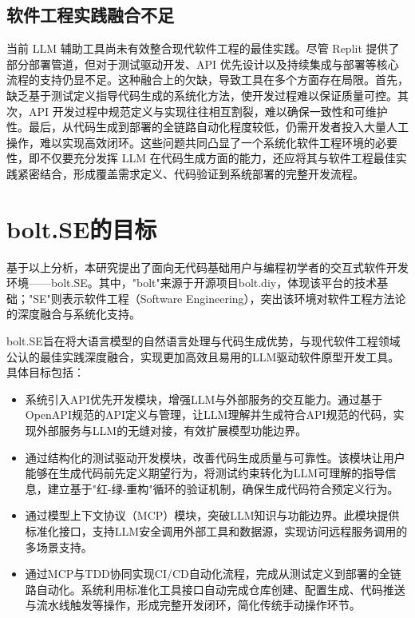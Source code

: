 \subsection{软件工程实践融合不足}

当前 LLM 辅助工具尚未有效整合现代软件工程的最佳实践。尽管 Replit 提供了部分部署管道，但对于测试驱动开发、API 优先设计以及持续集成与部署等核心流程的支持仍显不足。这种融合上的欠缺，导致工具在多个方面存在局限。首先，缺乏基于测试定义指导代码生成的系统化方法，使开发过程难以保证质量可控。其次，API 开发过程中规范定义与实现往往相互割裂，难以确保一致性和可维护性。最后，从代码生成到部署的全链路自动化程度较低，仍需开发者投入大量人工操作，难以实现高效闭环。这些问题共同凸显了一个系统化软件工程环境的必要性，即不仅要充分发挥 LLM 在代码生成方面的能力，还应将其与软件工程最佳实践紧密结合，形成覆盖需求定义、代码验证到系统部署的完整开发流程。

\section{bolt.SE的目标}

基于以上分析，本研究提出了面向无代码基础用户与编程初学者的交互式软件开发环境——bolt.SE。其中，"bolt"来源于开源项目bolt.diy，体现该平台的技术基础；"SE"则表示软件工程（Software Engineering），突出该环境对软件工程方法论的深度融合与系统化支持。

bolt.SE旨在将大语言模型的自然语言处理与代码生成优势，与现代软件工程领域公认的最佳实践深度融合，实现更加高效且易用的LLM驱动软件原型开发工具。具体目标包括：

\begin{itemize}
    \item 系统引入API优先开发模块，增强LLM与外部服务的交互能力。通过基于OpenAPI规范的API定义与管理，让LLM理解并生成符合API规范的代码，实现外部服务与LLM的无缝对接，有效扩展模型功能边界。
    \item 通过结构化的测试驱动开发模块，改善代码生成质量与可靠性。该模块让用户能够在生成代码前先定义期望行为，将测试约束转化为LLM可理解的指导信息，建立基于"红-绿-重构"循环的验证机制，确保生成代码符合预定义行为。
    \item 通过模型上下文协议（MCP）模块，突破LLM知识与功能边界。此模块提供标准化接口，支持LLM安全调用外部工具和数据源，实现访问远程服务调用的多场景支持。
    \item 通过MCP与TDD协同实现CI/CD自动化流程，完成从测试定义到部署的全链路自动化。系统利用标准化工具接口自动完成仓库创建、配置生成、代码推送与流水线触发等操作，形成完整开发闭环，简化传统手动操作环节。
\end{itemize}

